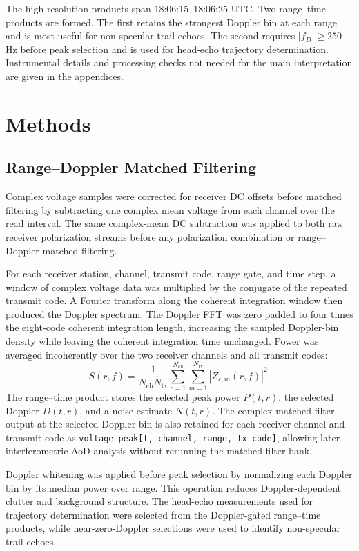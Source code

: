 The high-resolution products span 18:06:15--18:06:25 UTC.  Two range--time
products are formed.  The first retains the strongest Doppler bin at each
range and is most useful for non-specular trail echoes.  The second requires
\(|f_D| \ge 250\) Hz before peak selection and is used for head-echo trajectory
determination.  Instrumental details and processing checks not needed for the
main interpretation are given in the appendices.

\section{Methods}

\subsection{Range--Doppler Matched Filtering}

Complex voltage samples were corrected for receiver DC offsets before matched
filtering by subtracting one complex mean voltage from each channel over the
read interval.  The same complex-mean DC subtraction was applied to both raw
receiver polarization streams before any polarization combination or
range--Doppler matched filtering.

For each receiver station, channel, transmit code, range gate, and time step,
a window of complex voltage data was multiplied by the conjugate of the
repeated transmit code.  A Fourier transform along the coherent integration
window then produced the Doppler spectrum.  The Doppler FFT was zero padded to
four times the eight-code coherent integration length, increasing the sampled
Doppler-bin density while leaving the coherent integration time unchanged.
Power was averaged incoherently over the two receiver channels and all transmit
codes:
\[
  S(r,f) =
  \frac{1}{N_{\mathrm{ch}}N_{\mathrm{tx}}}
  \sum_{c=1}^{N_{\mathrm{ch}}}
  \sum_{m=1}^{N_{\mathrm{tx}}}
  \left|Z_{c,m}(r,f)\right|^2 .
\]
The range--time product stores the selected peak power \(P(t,r)\), the
selected Doppler \(D(t,r)\), and a noise estimate \(N(t,r)\).  The complex
matched-filter output at the selected Doppler bin is also retained for each
receiver channel and transmit code as
\texttt{voltage\_peak[t, channel, range, tx\_code]}, allowing later
interferometric AoD analysis without rerunning the matched filter bank.

Doppler whitening was applied before peak selection by normalizing each
Doppler bin by its median power over range.  This operation reduces
Doppler-dependent clutter and background structure.  The head-echo
measurements used for trajectory determination were selected from the
Doppler-gated range--time products, while near-zero-Doppler selections were
used to identify non-specular trail echoes.

